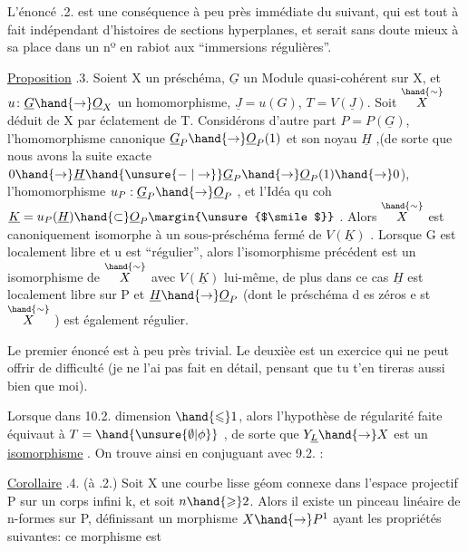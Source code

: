 
L'énoncé .2. est une conséquence à peu près immédiate du suivant,
\margin{|}qui est tout à fait indépendant d'histoires de sections hyperplanes, et
serait sans doute mieux à sa place dans  un nº en rabiot aux
``immersions régulières''.

\margin{|}\margin{\unsure{$\backslash\,/$}}\uline{Proposition} .3. Soient X un préschéma,  $\underline{G}$ un Module quasi-cohérent
sur X, et $u\colon \underline{G}\hand{\to}\underline{O}_X$ un homomorphisme, $\underline{J} = u(G)$, $T=V(\underline{J})$. Soit
$\overset{\hand{\sim}}{X}$ déduit de X par éclatement de T. Considérons d'autre part
$P = P(\underline{G})$, l'homomorphisme canonique $\underline{G}_P\hand{\to}\underline{O}_P(1)$ et son noyau
$\underline{H}$ ,(de sorte que nous avons la suite exacte $0\hand{\to}\underline{H}\hand{\unsure{\relbar|\to}}\underline{G}_P\hand{\to}\underline{O}_P(1)\hand{\to}0$),
l'homomorphisme $u_P : \underline{G}_P \hand{\to} \underline{O}_P$ , et l'Idéa qu coh $\underline{K} = u_P(\underline{H})\hand{\subset}\underline{O}_P\margin{\unsure{$\smile$}}$ .
Alors $\overset{\hand{\sim}}{X}$ est canoniquement isomorphe à un sous-préschéma fermé de
$V(\underline{K})$ . Lorsque G est localement libre et u est ``régulier'', alors
l'isomorphisme précédent est un isomorphisme de $\overset{\hand{\sim}}{X}$ avec $V(\underline{K})$ lui-même,
de plus dans ce cas $\underline{H}$ est localement libre sur P et  $\underline{H}\hand{\to}\underline{O}_P$
(dont le préschéma d es zéros e st $\overset{\hand{\sim}}{X}$ ) est également régulier.

Le premier énoncé est à peu près trivial. Le deuxièe est un
exercice qui ne peut offrir de difficulté (je ne l'ai pas fait en
détail, pensant que tu t'en tireras aussi bien que moi).

Lorsque dans 10.2.   dimension $\hand{\leqslant}1$,
alors l'hypothèse de régularité faite équivaut à $T = \hand{\unsure{\emptyset|\phi}}$ , de sorte
que $Y_{\underline{L}}\hand{\to} X$ est un \uline{isomorphisme} . On trouve ainsi\hand{;} en conjuguant
avec 9.2. :

\uline{Corollaire} .4. (à .2.) Soit X une courbe lisse géom connexe dans
 l'espace projectif P sur un corps infini k, et soit $n\hand{\geqslant}2$.
Alors il existe un pinceau linéaire de n-formes sur P, définissant un
morphisme $X\hand{\to}P^1$ ayant les propriétés suivantes: ce morphisme est

